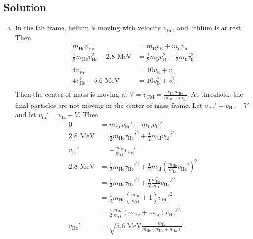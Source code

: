 \documentclass[solutions]{esg8012pset}
\begin{document}
\subsection{Solution}
  \begin{enumerate}[a)]
    \item In the lab frame, helium is moving with velocity $v_{\text{He}}$, and lithium is at rest.  Then \begin{align*}
    m_{\text{He}}v_{\text{He}} & = m_{\text{B}}v_{\text{B}} + m_{\text{n}}v_{\text{n}} \\
    \frac{1}{2}m_{\text{He}}v_{\text{He}}^2 - 2.8\text{ MeV} & = \frac{1}{2}m_{\text{B}}v_{\text{B}}^2 + \frac{1}{2}m_{\text{n}}v_{\text{n}}^2 \\
    \\
    4v_{\text{He}} & = 10v_{\text{B}} + v_{\text{n}} \\
    4v_{\text{He}}^2 - 5.6\text{ MeV} & = 10v_{\text{B}}^2 + v_{\text{n}}^2 \\
    \end{align*}
    Then the center of mass is moving at $V = v_{\text{CM}} = \frac{v_{\text{He}} m_{\text{He}}}{m_{\text{He}} + m_{\text{Li}}}$.  At threshold, the final particles are not moving in the center of mass frame.  Let $v_{\text{He}}' = v_{\text{He}} - V$ and let $v_{\text{Li}}' = v_{\text{Li}} - V$.  Then \begin{align*}
    0 & = m_{\text{He}}v_{\text{He}}' + m_{\text{Li}}v_{\text{Li}}' \\
    2.8\text{ MeV} & = \frac{1}{2}m_{\text{He}}v_{\text{He}}'^2 + \frac{1}{2}m_{\text{Li}}v_{\text{Li}}'^2 \\
    \\
    v_{\text{Li}}' & = -\frac{m_{\text{He}}}{m_{\text{Li}}}v_{\text{He}}' \\
    2.8\text{ MeV} & = \frac{1}{2}m_{\text{He}}v_{\text{He}}'^2 + \frac{1}{2}m_{\text{Li}}\left(\frac{m_{\text{He}}}{m_{\text{Li}}}v_{\text{He}}'\right)^2 \\
      & = \frac{1}{2}m_{\text{He}}v_{\text{He}}'^2 + \frac{1}{2}\frac{m_{\text{He}}^2}{m_{\text{Li}}}v_{\text{He}}'^2 \\
      & = \frac{1}{2}m_{\text{He}}\left(\frac{m_{\text{He}}}{m_{\text{Li}}} + 1\right)v_{\text{He}}'^2 \\
      & = \frac{1}{2}\frac{m_{\text{He}}}{m_{\text{Li}}}(m_{\text{He}} + m_{\text{Li}})v_{\text{He}}'^2 \\
    v_{\text{He}}' & = \sqrt{5.6\text{ MeV}\frac{m_{\text{Li}}}{m_{\text{He}}(m_{\text{He}} + m_{\text{Li}})}} \\

\end{align*}
\end{enumerate}
\end{document}
